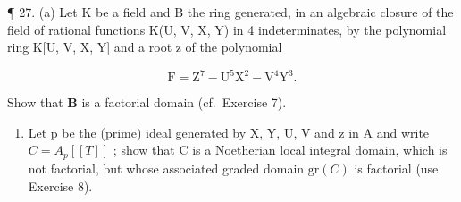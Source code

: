 ¶ 27. (a) Let K be a field and B the ring generated, in an algebraic closure of the field of rational functions K(U, V, X, Y) in 4 indeterminates, by the polynomial ring K{[}U, V, X, Y{]} and a root z of the polynomial

\[
\mathrm{F} = \mathrm{Z} ^ {7} - \mathrm{U} ^ {5} \mathrm{X} ^ {2} - \mathrm{V} ^ {4} \mathrm{Y} ^ {3}.
\]

Show that \(\mathbf{B}\) is a factorial domain (cf.~Exercise 7).

\begin{enumerate}
\def\labelenumi{(\alph{enumi})}
\setcounter{enumi}{1}
\tightlist
\item
  Let p be the (prime) ideal generated by X, Y, U, V and z in A and write \(C = A_{p}[[T]]\) ; show that C is a Noetherian local integral domain, which is not factorial, but whose associated graded domain \(\text{gr}(C)\) is factorial (use Exercise 8).
\end{enumerate}
